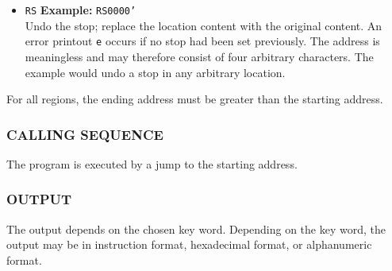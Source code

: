 \begin{itemize}
\item \texttt{RS}
\textbf{Example:} \texttt{RS0000'} \\
Undo the stop; replace the location content with the original content. An error printout \texttt{e} occurs if no stop had been set previously. The address is meaningless and may therefore consist of four arbitrary characters. The example would undo a stop in any arbitrary location.
\end{itemize}

For all regions, the ending address must be greater than the starting address.

\subsubsection*{CALLING SEQUENCE}
The program is executed by a jump to the starting address.

\subsubsection*{OUTPUT}
The output depends on the chosen key word. Depending on the key word, the output may be in instruction format, hexadecimal format, or alphanumeric format.

